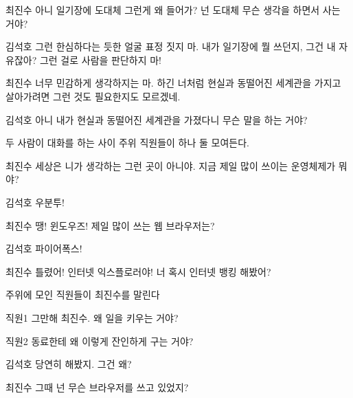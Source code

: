 \documentclass{screenplay}
\begin{document}
    \begin{dialogue}{최진수}
        아니 일기장에 도대체 그런게 왜 들어가? 넌 도대체 무슨 생각을 하면서 사는 거야?
    \end{dialogue}
    \begin{dialogue}{김석호}
        그런 한심하다는 듯한 얼굴 표정 짓지 마. 내가 일기장에 뭘 쓰던지, 그건 내 자유잖아? 그런 걸로 사람을 판단하지 마!
    \end{dialogue}
    \begin{dialogue}{최진수}
        너무 민감하게 생각하지는 마. 하긴 너처럼 현실과 동떨어진 세계관을 가지고 살아가려면 그런 것도 필요한지도 모르겠네.
    \end{dialogue}
    \begin{dialogue}{김석호}
        아니 내가 현실과 동떨어진 세계관을 가졌다니 무슨 말을 하는 거야?
    \end{dialogue}
    두 사람이 대화를 하는 사이 주위 직원들이 하나 둘 모여든다.
    \begin{dialogue}{최진수}
        세상은 니가 생각하는 그런 곳이 아니야. 지금 제일 많이 쓰이는 운영체제가 뭐야?
    \end{dialogue}
    \begin{dialogue}{김석호}
        우분투!
    \end{dialogue}
    \begin{dialogue}{최진수}
        땡! 윈도우즈!
        제일 많이 쓰는 웹 브라우저는?
    \end{dialogue}
    \begin{dialogue}{김석호}
        파이어폭스!
    \end{dialogue}
    \begin{dialogue}{최진수}
        틀렸어! 인터넷 익스플로러야! 
        너 혹시 인터넷 뱅킹 해봤어?
    \end{dialogue}
    주위에 모인 직원들이 최진수를 말린다
    \begin{dialogue}{직원1}
        그만해 최진수. 왜 일을 키우는 거야?
    \end{dialogue}
    \begin{dialogue}{직원2}
        동료한테 왜 이렇게 잔인하게 구는 거야?
    \end{dialogue}
    \begin{dialogue}{김석호}
        당연히 해봤지. 그건 왜?
    \end{dialogue}
    \begin{dialogue}{최진수}
        그때 넌 무슨 브라우저를 쓰고 있었지?
    \end{dialogue}
\end{document}
